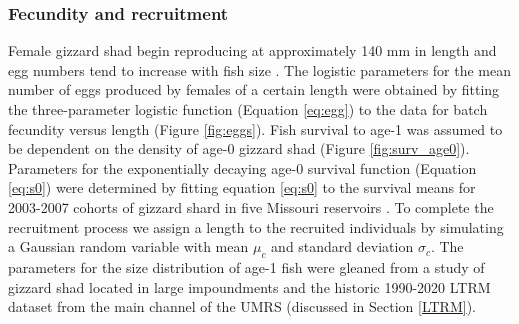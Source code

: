 \documentclass[preprint,review,12pt,authoryear]{elsarticle}
\begin{document}
\subsubsection{Fecundity and recruitment}
Female gizzard shad begin reproducing at approximately 140 mm in length and egg numbers tend to increase with fish size \citep{jons1997ovarian}. 
The logistic parameters for the mean number of eggs produced by females of a certain length were obtained by fitting the three-parameter logistic function (Equation \ref{eq:egg}) to the data for batch fecundity versus length \citep{jons1997ovarian} (Figure \ref{fig:eggs}). 
Fish survival to age-1 was assumed to be dependent on the density of age-0 gizzard shad (Figure \ref{fig:surv_age0}).  
Parameters for the exponentially decaying age-0 survival function (Equation \ref{eq:s0}) were determined by fitting equation \ref{eq:s0} to the survival means for 2003-2007 cohorts of gizzard shard in five Missouri reservoirs \citep{michaletz2010overwinter}.
To complete the recruitment process we assign a length to the recruited individuals by simulating a Gaussian random variable with mean $\mu_c$ and standard deviation $\sigma_c$.
The parameters for the size distribution of age-1 fish were gleaned from a study of gizzard shad located in large impoundments \citep{michaletz2017variation} and the historic 1990-2020 LTRM dataset from the main channel of the UMRS (discussed in Section \ref{LTRM}).
\end{document}
